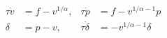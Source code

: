 \documentclass{article}
\begin{document}
\fontsize{22}{29}\selectfont
\[
\begin{aligned}\tau\dot v&=f-v^{1/\alpha},&\tau\dot p&=f-v^{1/\alpha-1}p\\\delta&=p-v,&\tau\dot\delta&=-v^{1/\alpha-1}\delta\end{aligned}
\]
\end{document}
